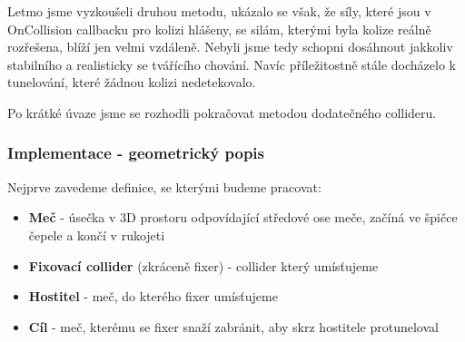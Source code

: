 Letmo jsme vyzkoušeli druhou metodu, ukázalo se však, že síly, které jsou v OnCollision callbacku pro kolizi hlášeny, se silám, kterými byla kolize reálně rozřešena, blíží jen velmi vzdáleně. Nebyli jsme tedy schopni dosáhnout jakkoliv stabilního a realisticky se tvářícího chování. Navíc příležitostně stále docházelo k tunelování, které žádnou kolizi nedetekovalo.

\bigbreak

Po krátké úvaze jsme se rozhodli pokračovat metodou dodatečného collideru.



\subsubsection*{Implementace - geometrický popis}

Nejprve zavedeme definice, se kterými budeme pracovat:
\begin{itemize}
  \item \textbf{Meč} - úsečka v 3D prostoru odpovídající středové ose meče, začíná ve špičce čepele a končí v rukojeti
  \item \textbf{Fixovací collider} (zkráceně fixer) - collider který umísťujeme 
  \item \textbf{Hostitel} - meč, do kterého fixer umísťujeme
  \item \textbf{Cíl} - meč, kterému se fixer snaží zabránit, aby skrz hostitele protuneloval
\end{itemize}

